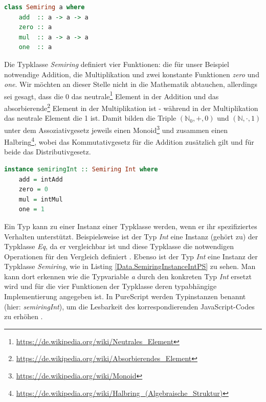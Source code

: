 \documentclass[
12pt,
ngerman,
oneside]
{scrbook} %
\begin{document}
\begin{lstlisting}[language=purescript, style=numbered-and-boxed, caption=Auszug PureScript Prelude - Typklasse Data.Semiring, label=Data.SemiringClassPS]
class Semiring a where
	add  :: a -> a -> a
	zero :: a
	mul  :: a -> a -> a
	one  :: a
\end{lstlisting}

Die Typklasse \emph{Semiring} definiert vier Funktionen: die für unser Beispiel notwendige Addition, die Multiplikation und zwei konstante Funktionen \emph{zero} und \emph{one}. Wir möchten an dieser Stelle nicht in die Mathematik abtauchen, allerdings sei gesagt, dass die 0 das neutrale\footnote{\href{https://de.wikipedia.org/wiki/Neutrales_Element}{https://de.wikipedia.org/wiki/Neutrales_Element}} Element in der  Addition und das absorbierende\footnote{\href{https://de.wikipedia.org/wiki/Absorbierendes_Element}{https://de.wikipedia.org/wiki/Absorbierendes_Element}} Element in der Multiplikation ist - während in der Multiplikation das neutrale Element die 1 ist. Damit bilden die Triple $(\mathbb{N}_0, +, 0)$ und $(\mathbb{N}, \cdot, 1)$ unter dem Assoziativgesetz jeweils einen Monoid\footnote{\href{https://de.wikipedia.org/wiki/Monoid}{https://de.wikipedia.org/wiki/Monoid}} und zusammen einen Halbring\footnote{\href{https://de.wikipedia.org/wiki/Halbring_(Algebraische_Struktur)}{https://de.wikipedia.org/wiki/Halbring_(Algebraische_Struktur)}}, wobei das Kommutativgesetz für die Addition zusätzlich gilt und für beide das Distributivgesetz.

\begin{lstlisting}[language=purescript, style=numbered-and-boxed, caption=Auszug PureScript Prelude - Typinstanz Data.SemiringInt, label=Data.SemiringInstanceIntPS]
instance semiringInt :: Semiring Int where
	add = intAdd
	zero = 0
	mul = intMul
	one = 1
\end{lstlisting}

Ein Typ kann zu einer Instanz einer Typklasse werden, wenn er ihr spezifiziertes Verhalten unterstützt. Beispielsweise ist der Typ \emph{Int} eine Instanz (\glqq gehört zu\grqq{}) der Typklasse \emph{Eq}, da er vergleichbar ist und diese Typklasse die notwendigen Operationen für den Vergleich definiert  \cite[Kap. Making our own Types and Typeclasses, Abschn. Derived instances]{Haskell11}. Ebenso ist der Typ \emph{Int} eine Instanz der Typklasse \emph{Semiring}, wie in Listing \ref{Data.SemiringInstanceIntPS} zu sehen. Man kann dort erkennen wie die Typvariable \emph{a} durch den konkreten Typ \emph{Int} ersetzt wird und für die vier Funktionen der Typklasse deren typabhängige Implementierung angegeben ist. In PureScript werden Typinstanzen benannt (hier: \emph{semiringInt}), um die Lesbarkeit des korrespondierenden JavaScript-Codes zu erhöhen \cite[][S. 64]{Freeman17}.
\end{document}
